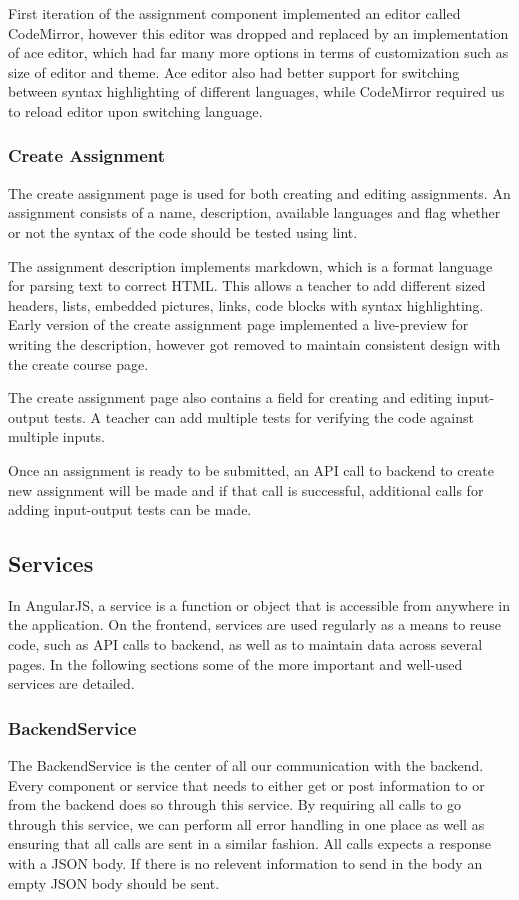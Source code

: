 First iteration of the assignment component implemented an editor called CodeMirror, however this editor was dropped and replaced by an implementation of ace editor, which had far many more options in terms of customization such as size of editor and theme. Ace editor also had better support for switching between syntax highlighting of different languages, while CodeMirror required us to reload editor upon switching language. 

\subsubsection{Create Assignment}
The create assignment page is used for both creating and editing assignments. An assignment consists of a name, description, available languages and flag whether or not the syntax of the code should be tested using lint. 

The assignment description implements markdown, which is a format language for parsing text to correct HTML. This allows a teacher to add different sized headers, lists, embedded pictures, links, code blocks with syntax highlighting. Early version of the create assignment page implemented a live-preview for writing the description, however got removed to maintain consistent design with the create course page. 

The create assignment page also contains a field for creating and editing input-output tests. A teacher can add multiple tests for verifying the code against multiple inputs.

Once an assignment is ready to be submitted, an API call to backend to create new assignment will be made and if that call is successful, additional calls for adding input-output tests can be made. 

\subsection{Services}
In AngularJS, a service is a function or object that is accessible from anywhere in the application. On the frontend, services are used regularly as a means to reuse code, such as API calls to backend, as well as to maintain data across several pages. In the following sections some of the more important and well-used services are detailed.

\subsubsection{BackendService}
The BackendService is the center of all our communication with the backend. Every component or service that needs to either get or post information to or from the backend does so through this service. By requiring all calls to go through this service, we can perform all error handling in one place as well as ensuring that all calls are sent in a similar fashion. All calls expects a response with a JSON body. If there is no relevent information to send in the body an empty JSON body should be sent.

